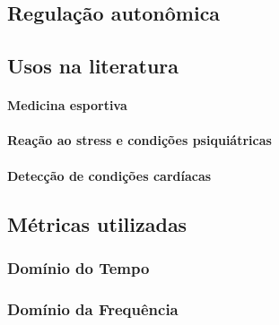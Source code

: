         \subsection {Regulação autonômica}
        
      
        \subsection {Usos na literatura}
        
            \paragraph{Medicina esportiva}
            
            \paragraph{Reação ao stress e condições psiquiátricas}
            
            \paragraph{Detecção de condições cardíacas}
        
        \subsection {Métricas utilizadas}
        
            \subsubsection{Domínio do Tempo}
            
            \subsubsection{Domínio da Frequência}





